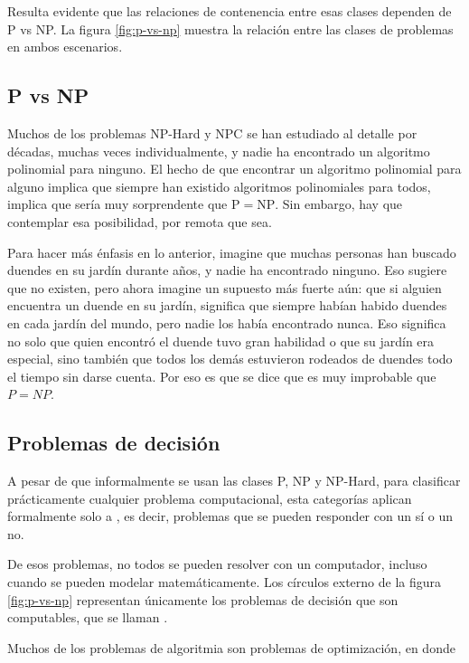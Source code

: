 Resulta evidente que las relaciones de contenencia entre esas clases dependen de P vs NP. La figura \ref{fig:p-vs-np} muestra la relación entre las clases de problemas en ambos escenarios.



\subsection{P vs NP}

Muchos de los problemas NP-Hard y NPC se han estudiado al detalle por décadas, muchas veces individualmente, y nadie ha encontrado un algoritmo polinomial para ninguno. El hecho de que encontrar un algoritmo polinomial para alguno implica que siempre han existido algoritmos polinomiales para todos, implica que sería muy sorprendente que \(\mathrm{P} = \mathrm{NP}\). Sin embargo, hay que contemplar esa posibilidad, por remota que sea.

Para hacer más énfasis en lo anterior, imagine que muchas personas han buscado duendes en su jardín durante años, y nadie ha encontrado ninguno. Eso sugiere que no existen, pero ahora imagine un supuesto más fuerte aún: que si alguien encuentra un duende en su jardín, significa que siempre habían habido duendes en cada jardín del mundo, pero nadie los había encontrado nunca. Eso significa no solo que quien encontró el duende tuvo gran habilidad o que su jardín era especial, sino también que todos los demás estuvieron rodeados de duendes todo el tiempo sin darse cuenta. Por eso es que se dice que es muy improbable que \(P = NP\).

\subsection{Problemas de decisión}

A pesar de que informalmente se usan las clases P, NP y NP-Hard, para clasificar prácticamente cualquier problema computacional, esta categorías aplican formalmente solo a , es decir, problemas que se pueden responder con un sí o un no. 

De esos problemas, no todos se pueden resolver con un computador, incluso cuando se pueden modelar matemáticamente. Los círculos externo de la figura \ref{fig:p-vs-np} representan únicamente los problemas de decisión que son computables, que se llaman . 

Muchos de los problemas de algoritmia son problemas de optimización, en donde 


